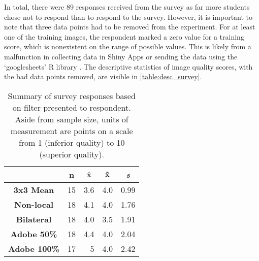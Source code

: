 \documentclass{ncjms}
\begin{document}

In total, there were 89 responses received from the survey as far more students chose not to respond than to respond to the survey. However, it is important to note that three data points had to be removed from the experiment. For at least one of the training images, the respondent marked a zero value for a training score, which is nonexistent on the range of possible values. This is likely from a malfunction in collecting data in Shiny Apps or sending the data using the `googlesheets' R library \citep{googlesheets}. The descriptive statistics of image quality scores, with the bad data points removed, are visible in \autoref{table:desc_survey}.

\begin{table}[ht]
\caption{Summary of survey responses based on filter presented to respondent. Aside from sample size, units of measurement are points on a scale from 1 (inferior quality) to 10 (superior quality).} %
\centering %
\begin{tabular}{|c|r|r|r|r|} %
\hline
 & \multicolumn{1}{c|}{\textbf{n}} & \multicolumn{1}{c|}{$\mathbf{\bar{x}}$} & \multicolumn{1}{c|}{$\mathbf{\Tilde{x}}$} & \multicolumn{1}{c|}{\textbf{\textit{s}}}\\ [0.5ex] 
\hline %
\textbf{3x3 Mean} & 15 & 3.6 & 4.0 & 0.99  \\ 
\textbf{Non-local} & 18 & 4.1 & 4.0 & 1.76 \\
\textbf{Bilateral} & 18 & 4.0 & 3.5 & 1.91 \\
\textbf{Adobe 50\%} & 18 & 4.4 & 4.0 & 2.04 \\
\textbf{Adobe 100\%} & 17 & 5 & 4.0 & 2.42 \\ [1ex] %
\hline %
\end{tabular}
\label{table:desc_survey} %
\end{table}

\end{document}
